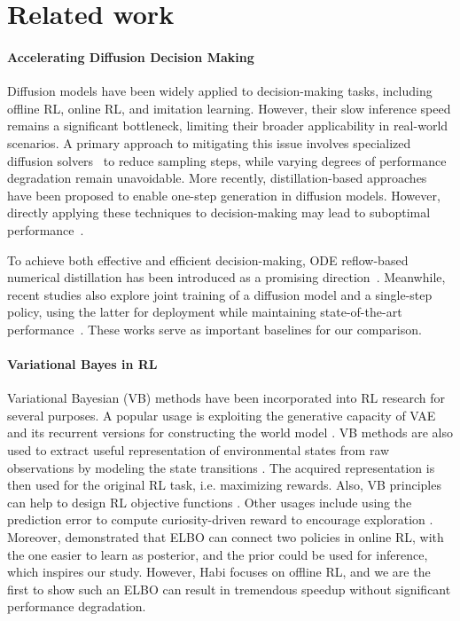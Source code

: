 \section{Related work}
\paragraph{Accelerating Diffusion Decision Making}
Diffusion models have been widely applied to decision-making tasks, including offline RL, online RL, and imitation learning. However, their slow inference speed remains a significant bottleneck, limiting their broader applicability in real-world scenarios. A primary approach to mitigating this issue involves specialized diffusion solvers~\cite{song2020denoising, lu2022dpm} to reduce sampling steps, while varying degrees of performance degradation remain unavoidable. More recently, distillation-based approaches~\cite{poole2022dreamfusion, wang2024prolificdreamer} have been proposed to enable one-step generation in diffusion models. However, directly applying these techniques to decision-making may lead to suboptimal performance~\cite{chen2024diffusion, chen2023score}.

To achieve both effective and efficient decision-making, ODE reflow-based numerical distillation has been introduced as a promising direction~\cite{dong2024diffuserlite}. Meanwhile, recent studies also explore joint training of a diffusion model and a single-step policy, using the latter for deployment while maintaining state-of-the-art performance~\cite{chen2024diffusion}. These works serve as important baselines for our comparison.

\paragraph{Variational Bayes in RL}
Variational Bayesian (VB) methods have been incorporated into RL research for several purposes. A popular usage is exploiting the generative capacity of VAE and its recurrent versions \cite{chung2015recurrent} for constructing the world model \cite{ha2018recurrent, hafner2018learning,hafner2023mastering}. VB methods are also used to extract useful representation of environmental states from raw observations by modeling the state transitions \cite{igl2018deep, han2020variational, ni2024bridging}. The acquired representation is then used for the original RL task, i.e. maximizing rewards. Also, VB principles can help to design RL objective functions \cite{levine2018controlAsProbInf, fellows2019virel, guan2024voce}. Other usages include using the prediction error to compute curiosity-driven reward to encourage exploration \cite{yin2021sequential}. Moreover,  \citet{han2022variational, han2024synergizing} demonstrated that ELBO can connect two policies in online RL, with the one easier to learn as posterior, and the prior could be used for inference, which inspires our study. However, Habi focuses on offline RL, and we are the first to show such an ELBO can result in tremendous speedup without significant performance degradation.